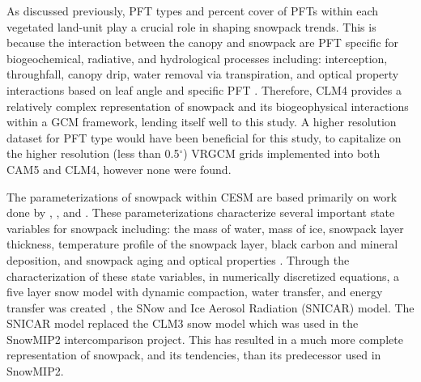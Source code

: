 \documentclass[11pt]{article}
\begin{document}
As discussed previously, PFT types and percent cover of PFTs within each vegetated land-unit play a crucial role in shaping snowpack trends. This is because the interaction between the canopy and snowpack are PFT specific for biogeochemical, radiative, and hydrological processes including: interception, throughfall, canopy drip, water removal via transpiration, and optical property interactions based on leaf angle and specific PFT \citep{lawrence2011parameterization}.  Therefore, CLM4 provides a relatively complex representation of snowpack and its biogeophysical interactions within a GCM framework, lending itself well to this study.   A higher resolution dataset for PFT type would have been beneficial for this study, to capitalize on the higher resolution (less than 0.5$^\circ$) VRGCM grids implemented into both CAM5 and CLM4, however none were found.

The parameterizations of snowpack within CESM are based primarily on work done by \citet{anderson1976point}, \citet{jordan1991one}, and \citet{yongjiu1997land}. These parameterizations characterize several important state variables for snowpack including: the mass of water, mass of ice, snowpack layer thickness, temperature profile of the snowpack layer, black carbon and mineral deposition, and snowpack aging and optical properties \citep{lawrence2011parameterization}. Through the characterization of these state variables, in numerically discretized equations, a five layer snow model with dynamic compaction, water transfer, and energy transfer was created \citep{lawrence2011parameterization}, the SNow and Ice Aerosol Radiation (SNICAR) model.  The SNICAR model replaced the CLM3 snow model which was used in the SnowMIP2 intercomparison project.  This has resulted in a much more complete representation of snowpack, and its tendencies, than its predecessor used in SnowMIP2.


\end{document}

